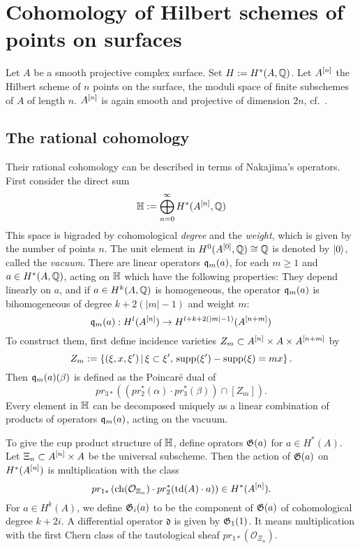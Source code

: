 \section{Cohomology of Hilbert schemes of points on surfaces}

Let $A$ be a smooth projective complex surface. Set $H:=H^*(A,\mathbb{Q})$. Let $A^{[n]}$ the Hilbert scheme of $n$ points on the surface, \ie the moduli space of finite subschemes of $A$ of length $n$.
$A^{[n]}$ is again smooth and projective of dimension $2n$, cf.~\cite{Fogarty}. 
\subsection{The rational cohomology}
Their rational cohomology can be described in terms of Nakajima's \cite{Nakajima} operators. First consider the direct sum
$$
\mathbb{H} := \bigoplus_{n=0}^{\infty} H^*(A^{[n]},\mathbb{Q})
$$
This space is bigraded by cohomological \emph{degree} and the \emph{weight}, which is given by the number of points $n$. The unit element in $H^0(A^{[0]},\mathbb{Q}) \cong \mathbb{Q}$ is denoted by $|0\rangle$, called the \emph{vacuum}.
There are linear operators $\mathfrak{q}_m(a)$, for each $m\geq 1$ and $a \in H^*(A,\mathbb{Q})$, acting on $\mathbb{H}$ which have the following properties: They depend linearly on $a$, and if $a\in H^k(A,\mathbb{Q})$ is homogeneous, the operator $\mathfrak{q}_{m}(a)$ is bihomogeneous of degree $k+2(|m|-1)$ and weight $m$:
$$
\mathfrak{q}_{m}(a) : H^l(A^{[n]}) \rightarrow H^{l+k+2(|m|-1)}(A^{[n+m]})
$$
To construct them, first define incidence varieties $Z_m\subset A^{[n]}\times A\times A^{[n+m]}$ by
$$
Z_m := \left\{(\xi,x,\xi')\, |\, \xi\subset\xi',\, \operatorname{supp}(\xi') -\operatorname{supp}(\xi) = mx \right\}.
$$
Then $\mathfrak{q}_m(a)(\beta) $ is defined as the Poincar\'e dual of 
$$
pr_{3*}\left( \left(pr_2^*(\alpha)\cdot pr_3^*(\beta)\right) \cap [Z_m] \right).
$$
Every element in $\mathbb{H}$ can be decomposed uniquely as a linear combination of products of operators $\mathfrak{q}_{m}(a)$, acting on the vacuum. 

To give the cup product structure of $\mathbb{H}$, define oprators $\mathfrak{G}(a)$ for $a \in H^*(A)$. Let $\Xi_n \subset A^{[n]}\times A$ be the universal subscheme. Then the action of $\mathfrak{G}(a)$ on $H^*(A^{[n]})$ is multiplication with the class
$$
pr_{1*}\left( \operatorname{ch}(\mathcal{O}_{\Xi_n})\cdot pr_2^*(\operatorname{td}(A)\cdot a) \right) \in H^*(A^{[n]}).
$$
For $a \in H^k(A)$, we define $\mathfrak{G}_i(a)$ to be the component of $\mathfrak{G}(a)$ of cohomological degree $k+2i$. A differential operator $\mathfrak{d}$ is given by $\mathfrak{G}_1(1)$. It means multiplication with the first Chern class of the tautological sheaf $pr_{1*}\left( \mathcal{O}_{\Xi_n}\right)$.

